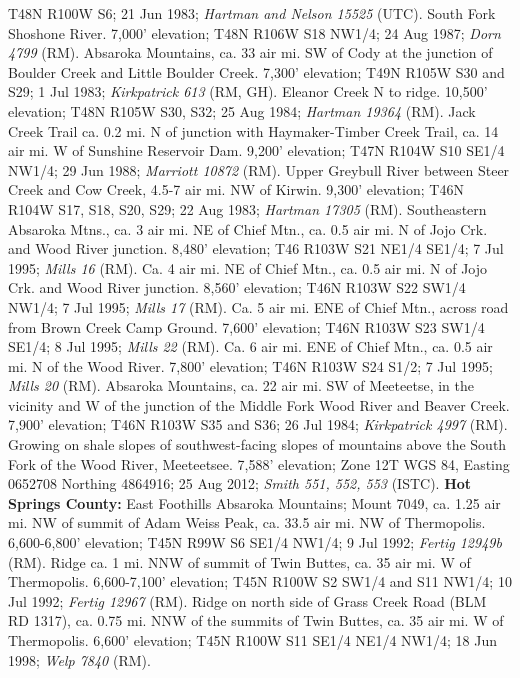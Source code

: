 T48N R100W S6; 21 Jun 1983; \textit{Hartman and Nelson 15525} (UTC).
South Fork Shoshone River. 7,000' elevation; T48N R106W S18 NW1/4; 24 Aug 1987;
\textit{Dorn 4799} (RM).
Absaroka Mountains, ca. 33 air mi. SW of Cody at the junction of Boulder Creek
and Little Boulder Creek. 7,300' elevation; T49N R105W S30 and S29; 1 Jul 1983;
\textit{Kirkpatrick 613} (RM, GH).
Eleanor Creek N to ridge. 10,500' elevation; T48N R105W S30, S32; 25 Aug 1984;
\textit{Hartman 19364} (RM).
Jack Creek Trail ca. 0.2 mi. N of junction with Haymaker-Timber Creek Trail,
ca. 14 air mi. W of Sunshine Reservoir Dam. 9,200' elevation; T47N R104W S10
SE1/4 NW1/4; 29 Jun 1988; \textit{Marriott 10872} (RM).
Upper Greybull River between Steer Creek and Cow Creek, 4.5-7 air mi. NW of
Kirwin. 9,300' elevation; T46N R104W S17, S18, S20, S29; 22 Aug 1983;
\textit{Hartman 17305} (RM).
Southeastern Absaroka Mtns., ca. 3 air mi. NE of Chief Mtn., ca. 0.5 air mi. N
of Jojo Crk. and Wood River junction. 8,480' elevation; T46 R103W S21 NE1/4
SE1/4; 7 Jul 1995; \textit{Mills 16} (RM).
Ca. 4 air mi. NE of Chief Mtn., ca. 0.5 air mi. N of Jojo Crk. and Wood River
junction. 8,560' elevation; T46N R103W S22 SW1/4 NW1/4; 7 Jul 1995;
\textit{Mills 17} (RM).
Ca. 5 air mi. ENE of Chief Mtn., across road from Brown Creek Camp Ground.
7,600' elevation; T46N R103W S23 SW1/4 SE1/4; 8 Jul 1995;
\textit{Mills 22} (RM).
Ca. 6 air mi. ENE of Chief Mtn., ca. 0.5 air mi. N of the Wood River. 7,800'
elevation; T46N R103W S24 S1/2; 7 Jul 1995; \textit{Mills 20} (RM).
Absaroka Mountains, ca. 22 air mi. SW of Meeteetse, in the vicinity and W of the
junction of the Middle Fork Wood River and Beaver Creek. 7,900' elevation;
T46N R103W S35 and S36; 26 Jul 1984; \textit{Kirkpatrick 4997} (RM).
Growing on shale slopes of southwest-facing slopes of mountains above the South
Fork of the Wood River, Meeteetsee. 7,588' elevation; Zone 12T WGS 84,
Easting 0652708 Northing 4864916; 25 Aug 2012;
\textit{Smith 551, 552, 553} (ISTC).
  \textbf{Hot Springs County:}
East Foothills Absaroka Mountains; Mount 7049, ca. 1.25 air mi. NW of summit of
Adam Weiss Peak, ca. 33.5 air mi. NW of Thermopolis. 6,600-6,800' elevation;
T45N R99W S6 SE1/4 NW1/4; 9 Jul 1992; \textit{Fertig 12949b} (RM).
Ridge ca. 1 mi. NNW of summit of Twin Buttes, ca. 35 air mi. W of Thermopolis.
6,600-7,100' elevation; T45N R100W S2 SW1/4 and S11 NW1/4; 10 Jul 1992;
\textit{Fertig 12967} (RM).
Ridge on north side of Grass Creek Road (BLM RD 1317), ca. 0.75 mi. NNW of the
summits of Twin Buttes, ca. 35 air mi. W of Thermopolis. 6,600' elevation;
T45N R100W S11 SE1/4 NE1/4 NW1/4; 18 Jun 1998; \textit{Welp 7840} (RM).
